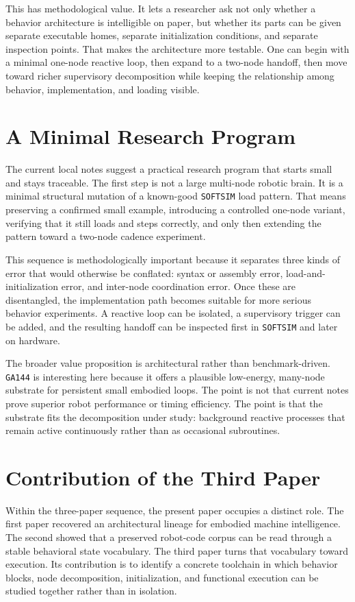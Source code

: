 \documentclass[11pt]{article}
\begin{document}
This has methodological value. It lets a researcher ask not only whether a
behavior architecture is intelligible on paper, but whether its parts can be
given separate executable homes, separate initialization conditions, and
separate inspection points. That makes the architecture more testable. One
can begin with a minimal one-node reactive loop, then expand to a two-node
handoff, then move toward richer supervisory decomposition while keeping the
relationship among behavior, implementation, and loading visible.

\section{A Minimal Research Program}

The current local notes suggest a practical research program that starts
small and stays traceable. The first step is not a large multi-node robotic
brain. It is a minimal structural mutation of a known-good \texttt{SOFTSIM}
load pattern. That means preserving a confirmed small example, introducing a
controlled one-node variant, verifying that it still loads and steps
correctly, and only then extending the pattern toward a two-node cadence
experiment.

This sequence is methodologically important because it separates three kinds
of error that would otherwise be conflated: syntax or assembly error,
load-and-initialization error, and inter-node coordination error. Once these
are disentangled, the implementation path becomes suitable for more serious
behavior experiments. A reactive loop can be isolated, a supervisory trigger
can be added, and the resulting handoff can be inspected first in
\texttt{SOFTSIM} and later on hardware.

The broader value proposition is architectural rather than benchmark-driven.
\texttt{GA144} is interesting here because it offers a plausible low-energy,
many-node substrate for persistent small embodied loops. The point is not
that current notes prove superior robot performance or timing efficiency.
The point is that the substrate fits the decomposition under study:
background reactive processes that remain active continuously rather than as
occasional subroutines.

\section{Contribution of the Third Paper}

Within the three-paper sequence, the present paper occupies a distinct role.
The first paper recovered an architectural lineage for embodied machine
intelligence. The second showed that a preserved robot-code corpus can be
read through a stable behavioral state vocabulary. The third paper turns
that vocabulary toward execution. Its contribution is to identify a concrete
toolchain in which behavior blocks, node decomposition, initialization, and
functional execution can be studied together rather than in isolation.
\end{document}
